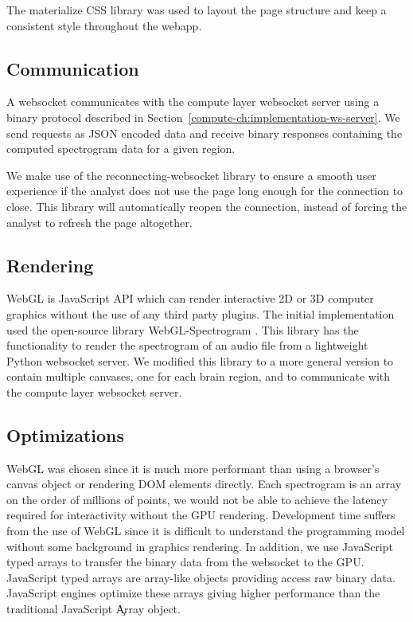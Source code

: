 The materialize CSS library \cite{materialize} was used to layout the page
structure and keep a consistent style throughout the webapp.

\subsection{Communication}

A websocket communicates with the compute layer websocket server using a binary
protocol described in Section~\ref{compute-ch:implementation-ws-server}. We
send requests as JSON encoded data and receive binary responses containing the
computed spectrogram data for a given region.

We make use of the reconnecting-websocket \cite{reconnecting-websocket} library
to ensure a smooth user experience if the analyst does not use the page long
enough for the connection to close. This library will automatically reopen the
connection, instead of forcing the analyst to refresh the page altogether.

\subsection{Rendering}

WebGL is JavaScript API which can render interactive 2D or 3D computer graphics
without the use of any third party plugins. The initial implementation used the
open-source library WebGL-Spectrogram \cite{webgl-spectrogram}. This library
has the functionality to render the spectrogram of an audio file from a
lightweight Python websocket server. We modified this library to a more general
version to contain multiple canvases, one for each brain region, and to
communicate with the compute layer websocket server. \\

\subsection{Optimizations}

WebGL was chosen since it is much more performant than using a browser's canvas
object or rendering DOM elements directly. Each spectrogram is an array on the
order of millions of points, we would not be able to achieve the latency
required for interactivity without the GPU rendering. Development time suffers
from the use of WebGL since it is difficult to understand the programming model
without some background in graphics rendering. In addition, we use JavaScript
typed arrays to transfer the binary data from the websocket to the GPU.
JavaScript typed arrays are array-like objects providing access raw binary
data. JavaScript engines optimize these arrays giving higher performance than
the traditional JavaScript \c{Array} object.

